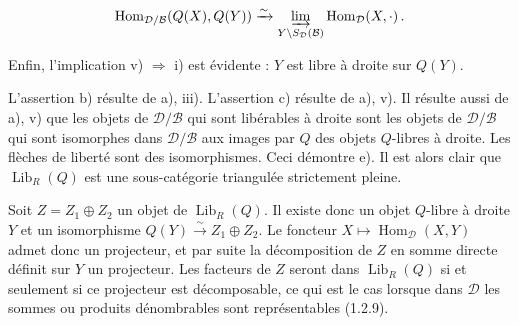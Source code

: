 \[
  \operatorname{Hom}_{\mathcal D/\mathcal B}(Q(X),Q(Y))
  \xrightarrow{\sim}
  \varinjlim_{Y\backslash S_{\mathcal D}(\mathcal B)}
  \operatorname{Hom}_{\mathcal D}(X,\mathord\cdot)\, .
\]

Enfin, l'implication v) $\Rightarrow$ i) est évidente : $Y$ est libre à
droite sur $Q(Y)$.

L'assertion b) résulte de a), iii). L'assertion c) résulte de a), v). Il
résulte aussi de a), v) que les objets de $\mathcal D/\mathcal B$ qui sont
libérables à droite sont les objets de $\mathcal D/\mathcal B$ qui sont
isomorphes dans $\mathcal D/\mathcal B$ aux images par $Q$ des objets
$Q$-libres à droite. Les flèches de liberté sont des isomorphismes. Ceci
démontre e). Il est alors clair que $\operatorname{Lib}_R(Q)$ est une
sous-catégorie triangulée strictement pleine.

Soit $Z=Z_1\oplus Z_2$ un objet de $\operatorname{Lib}_R(Q)$. Il existe donc
un objet $Q$-libre à droite $Y$ et un isomorphisme
$Q(Y)\xrightarrow{\sim}Z_1\oplus Z_2$. Le foncteur
$X\longmapsto\operatorname{Hom}_{\mathcal D}(X,Y)$ admet donc un projecteur,
et par suite la décomposition de $Z$ en somme directe définit sur $Y$ un
projecteur. Les facteurs de $Z$ seront dans $\operatorname{Lib}_R(Q)$ si et
seulement si ce projecteur est décomposable, ce qui est le cas lorsque dans
$\mathcal D$ les sommes ou produits dénombrables sont représentables
(1.2.9).
\endgroup
